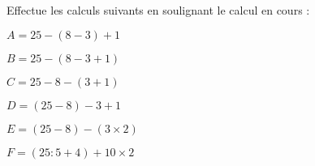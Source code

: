 \vspace*{1em}
\newpage



\begin{exercice}
Effectue les calculs suivants en soulignant le calcul en cours :
 \begin{colitemize}{2}
\item $A = 25 - ( 8 - 3 ) + 1$

\dotfill

\dotfill

\dotfill

\item $B = 25 - ( 8 - 3 + 1)$

\dotfill

\dotfill

\dotfill

\item $C = 25 - 8 - ( 3 + 1 )$

\dotfill

\dotfill

\dotfill

\item $D = ( 25 - 8 ) - 3 + 1$

\dotfill

\dotfill

\dotfill

\item $E = ( 25 - 8 ) - ( 3 \times 2 )$

\dotfill

\dotfill

\dotfill

\item {\small $F = ( 25 : 5 + 4 ) + 10 \times 2$}

\dotfill

\dotfill

\dotfill
 \end{colitemize}
\end{exercice}


